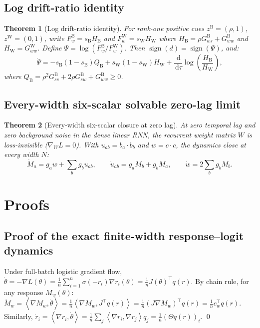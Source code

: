 \documentclass{article}
\newtheorem{theorem}{Theorem}
\theoremstyle{definition}
\theoremstyle{remark}
\newcommand{\ip}[2]{\left\langle #1,#2\right\rangle}
\newcommand{\sigm}{\sigma}
\newcommand{\Bcond}{\mathrm{B}}
\newcommand{\Wcond}{\mathrm{W}}
\newcommand{\dd}{\,\mathrm{d}}
\begin{document}
\subsection{Log drift-ratio identity}
\begin{theorem}[Log drift-ratio identity]
\label{thm:app-log-ratio}
For rank-one positive cues $z^{\Bcond} = (\rho, 1)$, $z^{\Wcond} = (0, 1)$, write $F_w^{\Bcond} = s_{\Bcond} H_{\Bcond}$ and $F_w^{\Wcond} = s_{\Wcond} H_{\Wcond}$ where $H_{\Bcond} = \rho G_{ws}^{\Bcond} + G_{ww}^{\Bcond}$ and $H_{\Wcond} = G_{ww}^{\Wcond}$. Define $\Psi = \log(F_w^{\Bcond} / F_w^{\Wcond})$. Then $\operatorname{sign}(d) = \operatorname{sign}(\Psi)$, and:
\begin{equation}
  \dot{\Psi} = -s_{\Bcond}(1-s_{\Bcond}) Q_{\Bcond} + s_{\Wcond}(1-s_{\Wcond}) H_{\Wcond} + \frac{\dd}{\dd \tau} \log\left(\frac{H_{\Bcond}}{H_{\Wcond}}\right),
  \label{eq:app-psi-dot}
\end{equation}
where $Q_{\Bcond} = \rho^2 G_{ss}^{\Bcond} + 2\rho G_{sw}^{\Bcond} + G_{ww}^{\Bcond} \ge 0$.
\end{theorem}

\subsection{Every-width six-scalar solvable zero-lag limit}
\begin{theorem}[Every-width six-scalar closure at zero lag]
\label{thm:app-six-scalar}
At zero temporal lag and zero background noise in the dense linear RNN, the recurrent weight matrix $W$ is loss-invisible ($\nabla_W L = 0$). With $u_{ab} = b_a \cdot b_b$ and $w = c \cdot c$, the dynamics close at every width $N$:
\begin{equation}
  \dot M_a = g_a w + \sum_b g_b u_{ab}, \qquad \dot u_{ab} = g_a M_b + g_b M_a, \qquad \dot w = 2\sum_b g_b M_b.
  \label{eq:app-six-scalar-eqs}
\end{equation}
\end{theorem}

\section{Proofs}
\label{app:proofs}
\setcounter{equation}{0}
\setcounter{theorem}{0}
\setcounter{table}{0}
\setcounter{figure}{0}

\subsection{Proof of the exact finite-width response--logit dynamics}
\label{app:proof-prop-exact}
Under full-batch logistic gradient flow, $\dot{\theta} = -\nabla L(\theta) = \frac1n \sum_{i=1}^n \sigm(-r_i) \nabla r_i(\theta) = \frac1n J(\theta)^\top q(r)$.
By chain rule, for any response $M_w(\theta)$:
$\dot{M}_w = \ip{\nabla M_w}{\dot{\theta}} = \frac1n \ip{\nabla M_w}{J^\top q(r)} = \frac1n (J \nabla M_w)^\top q(r) = \frac1n c_w^\top q(r)$.
Similarly, $\dot{r}_i = \ip{\nabla r_i}{\dot{\theta}} = \frac1n \sum_j \ip{\nabla r_i}{\nabla r_j} q_j = \frac1n (\Theta q(r))_i$. \qed
\end{document}
